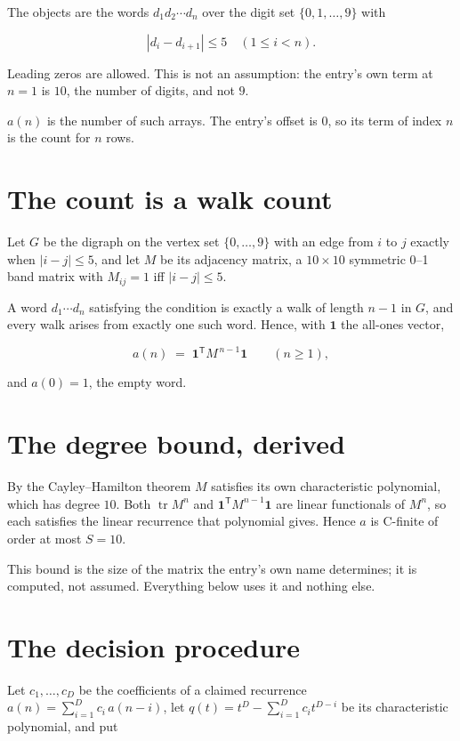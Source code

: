 \documentclass[11pt]{article}
\theoremstyle{definition}
\begin{document}
The objects are the words $d_1 d_2 \cdots d_n$ over the digit set $\{0,1,\dots,9\}$ with

\[|d_i - d_{i+1}| \le 5\quad (1 \le i < n).\]

Leading zeros are allowed. This is not an assumption: the entry's own term at $n=1$ is $10$, the number of digits, and not $9$.

$a(n)$ is the number of such arrays. The entry's offset is 0, so its term of index $n$ is the count for $n$ rows.

\section{The count is a walk count}

Let $G$ be the digraph on the vertex set $\{0,\dots,9\}$ with an edge from $i$ to $j$ exactly when $|i-j| \le 5$, and let $M$ be its adjacency matrix, a $10 \times 10$ symmetric 0--1 band matrix with $M_{ij} = 1$ iff $|i-j| \le 5$.

A word $d_1\cdots d_n$ satisfying the condition is exactly a walk of length $n-1$ in $G$, and every walk arises from exactly one such word. Hence, with $\mathbf 1$ the all-ones vector,

\[a(n) \;=\; \mathbf 1^{\mathsf T} M^{\,n-1} \mathbf 1 \qquad (n \ge 1),\]

and $a(0) = 1$, the empty word.

\section{The degree bound, derived}

By the Cayley--Hamilton theorem $M$ satisfies its own characteristic polynomial, which has degree $10$. Both $\operatorname{tr} M^n$ and $\mathbf 1^{\mathsf T} M^{n-1} \mathbf 1$ are linear functionals of $M^{n}$, so each satisfies the linear recurrence that polynomial gives. Hence $a$ is C-finite of order at most $S = 10$.

This bound is the size of the matrix the entry's own name determines; it is computed, not assumed. Everything below uses it and nothing else.

\section{The decision procedure}

Let $c_1,\dots,c_D$ be the coefficients of a claimed recurrence $a(n) = \sum_{i=1}^{D} c_i\,a(n-i)$, let $q(t) = t^{D} - \sum_{i=1}^{D} c_i t^{D-i}$ be its characteristic polynomial, and put
\end{document}
